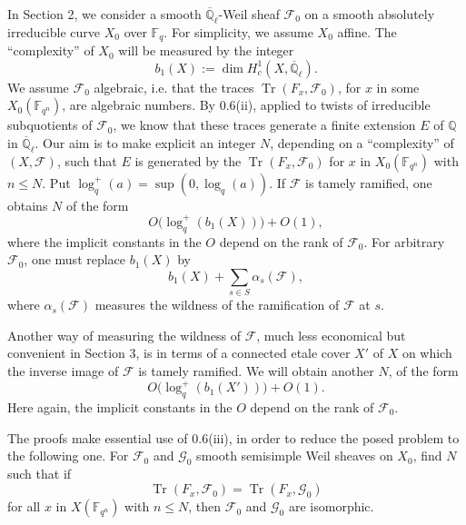 \documentclass[11pt]{article}
\newcommand{\F}{\mathbb{F}}
\newcommand{\Q}{\mathbb{Q}}
\newcommand{\Ql}{\overline{\mathbb Q}_{\ell}}
\newcommand{\Tr}{\operatorname{Tr}}
\begin{document}
In Section 2, we consider a smooth $\Ql$-Weil sheaf $\mathcal F_0$ on a smooth absolutely irreducible curve $X_0$ over $\F_q$.
For simplicity, we assume $X_0$ affine.
The ``complexity'' of $X_0$ will be measured by the integer
\[
 b_1(X):=\dim H^1_c(X,\Ql).
\]
We assume $\mathcal F_0$ algebraic, i.e. that the traces $\Tr(F_x,\mathcal F_0)$, for $x$ in some $X_0(\F_{q^n})$, are algebraic numbers.
By 0.6(ii), applied to twists of irreducible subquotients of $\mathcal F_0$, we know that these traces generate a finite extension $E$ of $\Q$ in $\Ql$.
Our aim is to make explicit an integer $N$, depending on a ``complexity'' of $(X,\mathcal F)$, such that $E$ is generated by the $\Tr(F_x,\mathcal F_0)$ for $x$ in $X_0(\F_{q^n})$ with $n\le N$.
Put $\log_q^+(a)=\sup(0,\log_q(a))$.
If $\mathcal F$ is tamely ramified, one obtains $N$ of the form
\begin{equation}
O\bigl(\log_q^+(b_1(X))\bigr)+O(1),
\tag{0.9.1}
\end{equation}
where the implicit constants in the $O$ depend on the rank of $\mathcal F_0$.
For arbitrary $\mathcal F_0$, one must replace $b_1(X)$ by
\[
 b_1(X)+\sum_{s\in S}\alpha_s(\mathcal F),
\]
where $\alpha_s(\mathcal F)$ measures the wildness of the ramification of $\mathcal F$ at $s$.

Another way of measuring the wildness of $\mathcal F$, much less economical but convenient in Section 3, is in terms of a connected etale cover $X'$ of $X$ on which the inverse image of $\mathcal F$ is tamely ramified.
We will obtain another $N$, of the form
\begin{equation}
O\bigl(\log_q^+(b_1(X'))\bigr)+O(1).
\tag{0.9.2}
\end{equation}
Here again, the implicit constants in the $O$ depend on the rank of $\mathcal F_0$.

The proofs make essential use of 0.6(iii), in order to reduce the posed problem to the following one.
For $\mathcal F_0$ and $\mathcal G_0$ smooth semisimple Weil sheaves on $X_0$, find $N$ such that if
\[
 \Tr(F_x,\mathcal F_0)=\Tr(F_x,\mathcal G_0)
\]
for all $x$ in $X(\F_{q^n})$ with $n\le N$, then $\mathcal F_0$ and $\mathcal G_0$ are isomorphic.
\end{document}
